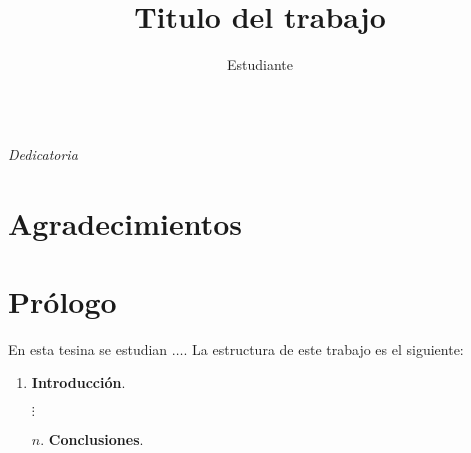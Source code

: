 \documentclass[10pt,twoside,openright,chapterprefix]{scrbook} %
\title{Titulo del trabajo}
\author{Estudiante}
\date{}
\begin{document}



\newpage
\thispagestyle{empty}
$\,$
\vspace{5.7cm}
\begin{flushright}
{\em {\Large Dedicatoria}}
\end{flushright}
\clearpage

\thispagestyle{empty}
\section*{Agradecimientos}

\noindent

\maketitle
\section*{Prólogo}

En esta tesina se estudian $\ldots$.
La estructura de este trabajo es el siguiente:

\begin{enumerate}
  \item {\bfseries Introducci\'on}.
  \item[] {\bfseries $\vdots$}
  \item[$n.$] {\bfseries Conclusiones}.
\end{enumerate}

\tableofcontents



% 
% 
% 
% 

%


\end{document}
